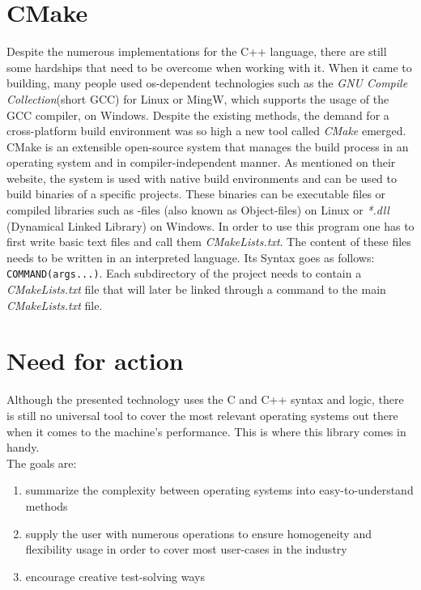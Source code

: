 \section{CMake}
Despite the numerous implementations for the C++ language, there are still some hardships that need to be overcome when working with it. When it came to building, many people used os-dependent technologies such as the \textit{GNU Compile Collection}(short GCC) for Linux\cite{gcc} or MingW, which supports the usage of the GCC compiler, on Windows\cite{mingw}. Despite the existing methods, the demand \dq for a cross-platform build environment\dq{} was so high a new tool called \textit{CMake} emerged\cite{cmake-overview}.\\
\dq CMake is an extensible open-source system that manages the build process in an operating system and in compiler-independent manner\dq{}. As mentioned on their website, the system is used with native build environments and can be used to build binaries of a specific projects. These binaries can be executable files or compiled libraries such as -files (also known as Object-files) on Linux or \textit{*.dll} (Dynamical Linked Library) on Windows. In order to use this program one has to first write basic text files and call them \textit{CMakeLists.txt}. The content of these files needs to be written in an interpreted language. Its Syntax goes as follows: \texttt{COMMAND(args...)}. Each subdirectory of the project needs to contain a \textit{CMakeLists.txt} file that will later be linked through a command to the main \textit{CMakeLists.txt} file. 

\section{Need for action}
Although the presented technology uses the C and C++ syntax and logic, there is still no universal tool to cover the most relevant operating systems out there when it comes to the machine's performance. This is where this library comes in handy.\\
The goals are:
\begin{enumerate}
	\item summarize the complexity between operating systems into easy-to-understand methods
	\item supply the user with numerous operations to ensure homogeneity and flexibility usage in order to cover most user-cases in the industry 
	\item  encourage creative test-solving ways   
\end{enumerate}
